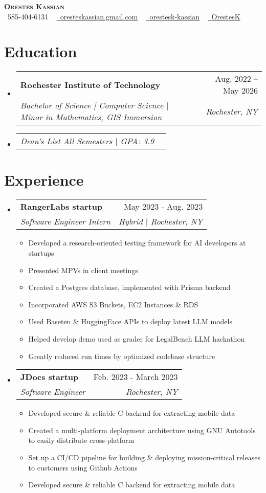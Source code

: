 \documentclass[letterpaper,11pt]{article}
\makeatletter
\newcommand{\resumeItem}[1]{
  \item\small{
    {#1 \vspace{-2pt}}
  }
}
\newcommand{\resumeSubheading}[4]{
  \vspace{-2pt}\item
    \begin{tabular*}{0.97\textwidth}[t]{l@{\extracolsep{\fill}}r}
      \textbf{#1} & #2 \\
      \textit{\small#3} & \textit{\small #4} \\
    \end{tabular*}\vspace{-7pt}
}
\newcommand{\resumeSubSubheading}[2]{
    \item
    \begin{tabular*}{0.97\textwidth}{l@{\extracolsep{\fill}}r}
      \textit{\small#1} & \textit{\small #2} \\
    \end{tabular*}\vspace{-7pt}
}
\newcommand{\resumeSubHeadingListStart}{\begin{itemize}[leftmargin=0.15in, label={}]}
\newcommand{\resumeSubHeadingListEnd}{\end{itemize}}
\newcommand{\resumeItemListStart}{\begin{itemize}}
\newcommand{\resumeItemListEnd}{\end{itemize}\vspace{-5pt}}
\makeatother
\begin{document}
\begin{center}
    \textbf{\Huge \scshape Orestes Kassian} \\ \vspace{4pt}
    \small 
    \faPhone\ 585-404-6131 ~
    \href{oresteskassian@gmail.com}{\faEnvelope\ \uline{oresteskassian.gmail.com}} ~
    \href{https://linkedin.com/in/orestes-kassian}{\faLinkedin\ \uline{orestesk-kassian}} ~
    \href{https://github.com/OrestesK}{\faGithub\ \uline{OrestesK}}
\end{center}
\vspace{-22pt}

\section{Education}
\resumeSubHeadingListStart
    \resumeSubheading
        {Rochester Institute of Technology}{ Aug. 2022 -- May 2026}
        {Bachelor of Science | Computer Science $|$ Minor in Mathematics, GIS Immersion}{ Rochester, NY}
    \vspace{-8pt}
    \resumeSubSubheading
    {Dean’s List All Semesters $|$ GPA: 3.9}{}
\resumeSubHeadingListEnd

\section{Experience}
\resumeSubHeadingListStart
    \resumeSubheading
        {RangerLabs startup}{ May 2023 - Aug. 2023}
        {Software Engineer Intern}{ Hybrid $|$ Rochester, NY}
    \resumeItemListStart
        \resumeItem{Developed a research-oriented testing framework for AI developers at startups}
        \resumeItem{Presented MPVs in client meetings}
        \resumeItem{Created a Postgres database, implemented with Prisma backend}
        \resumeItem{Incorporated AWS S3 Buckets, EC2 Instances \& RDS}
        \resumeItem{Used Baseten \& HuggingFace APIs to deploy latest LLM models}
        \resumeItem{Helped develop demo used as grader for LegalBench LLM hackathon}
        \resumeItem{Greatly reduced run times by optimized codebase structure}
    \resumeItemListEnd

    \resumeSubheading
        {JDocs startup}{ Feb. 2023 - March 2023}
        {Software Engineer}{ Rochester, NY}
    \resumeItemListStart
        \resumeItem{Developed secure \& reliable C backend for extracting mobile data}
        \resumeItem{Created a multi-platform deployment architecture using GNU Autotools to easily distribute cross-platform}
        \resumeItem{Set up a CI/CD pipeline for building & deploying mission-critical releases to customers using Github Actions}
        \resumeItem{Developed secure \& reliable C backend for extracting mobile data}
    \resumeItemListEnd
\resumeSubHeadingListEnd
\end{document}
